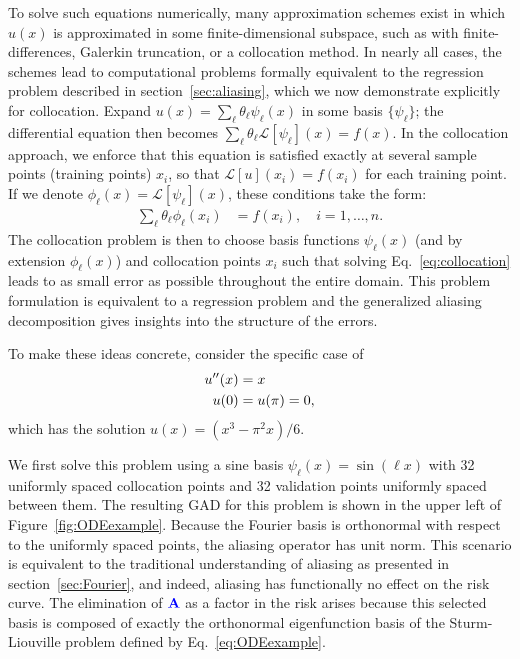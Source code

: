 \documentclass[twocolumn,aps,prx,superscriptaddress,10pt]{revtex4-2}
\newcommand{\0}{\bm{0}}
\newcommand{\bbA}{{\color{blue}{\mathbf{A}}}}  %
\begin{document}
To solve such equations numerically, many approximation schemes exist in which $u(x)$ is approximated in some finite-dimensional subspace, such as with finite-differences, Galerkin truncation, or a collocation method.
In nearly all cases, the schemes lead to computational problems formally equivalent to the regression problem described in section~\ref{sec:aliasing}, which we now demonstrate explicitly for collocation.
Expand $u(x) = \sum_{\ell} \theta_{\ell}\psi_{\ell} (x)$ in some basis $\{\psi_{\ell}\}$; the differential equation then becomes $\sum_{\ell} \theta_{\ell} \mathcal{L}[\psi_{\ell}](x) = f(x)$.
In the collocation approach, we enforce that this equation is satisfied exactly at several sample points (training points) $x_i$, so that $\mathcal{L}[u](x_i) = f(x_i)$ for each training point.
If we denote $\phi_{\ell}(x) = \mathcal{L}[\psi_{\ell}](x)$, these conditions take the form:
\begin{align}
  \label{eq:collocation}
  \sum_{\ell} \theta_{\ell} \phi_{\ell}(x_i) & = f(x_i), \quad i = 1, \dots, n.
\end{align}
The collocation problem is then to choose basis functions $\psi_{\ell}(x)$ (and by extension $\phi_{\ell}(x)$) and collocation points $x_i$ such that solving Eq.~\eqref{eq:collocation} leads to as small error as possible throughout the entire domain.
This problem formulation is equivalent to a regression problem and the generalized aliasing decomposition gives insights into the structure of the errors.

To make these ideas concrete, consider the specific case of
\begin{align}
  \label{eq:ODEexample}
  u''(x) & = x \\
  u(0) & = u(\pi) = 0,\notag
\end{align}
which has the solution $u(x) = (x^3 - \pi^2x)/6$.

We first solve this problem using a sine basis $\psi_{\ell}(x) = \sin({\ell}x)$ with 32 uniformly spaced collocation points and 32 validation points uniformly spaced between them.
The resulting GAD for this problem is shown in the upper left of Figure~\ref{fig:ODEexample}.
Because the Fourier basis is orthonormal with respect to the uniformly spaced points, the aliasing operator has unit norm.
This scenario is equivalent to the traditional understanding of aliasing as presented in section~\ref{sec:Fourier}, and indeed, aliasing has functionally no effect on the risk curve.  The elimination of $\bbA$ as a factor in the risk arises because this selected basis is composed of exactly the orthonormal eigenfunction basis of the Sturm-Liouville problem defined by Eq.~\eqref{eq:ODEexample}.
\end{document}
